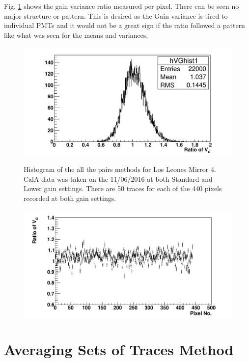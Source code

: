 Fig. \ref{fig:GainVarsRatioVsPixel_PairsEx} shows the gain variance ratio measured per pixel. There can be seen no major structure or pattern. This is desired as the Gain variance is tired to individual PMTs and it would not be a great sign if the ratio followed a pattern like what was seen for the means and variances.

\begin{figure} %
\includegraphics[width=\textwidth]{chapters/graphs/GainVarsMeas/LL_m04_2016-06-11/Set0and2/GainVairanceHist_Pairs.pdf}
\caption{Histogram of the all the pairs methods for Los Leones Mirror 4. CalA data was taken on the 11/06/2016 at both Standard and Lower gain settings. There are 50 traces for each of the 440 pixels recorded at both gain settings. } \label{fig:GainVarsRatio_Hist_PairsEx}
\vspace{3mm}
\includegraphics[width=\textwidth]{chapters/graphs/GainVarsMeas/LL_m04_2016-06-11/Set0and2/GainVars_Vs_Pixel_GainVariance_Pairs_Set0and2.pdf}
\caption{} \label{fig:GainVarsRatioVsPixel_PairsEx}
\end{figure}

\section{Averaging Sets of Traces Method}

